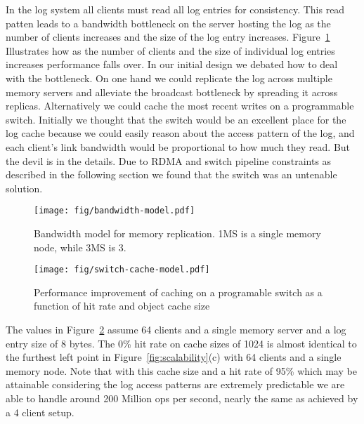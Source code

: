 \documentclass[12pt]{ucsddissertation}
\begin{document}
In the log system all clients must read all log entries for consistency. This read patten leads to a
bandwidth bottleneck on the server hosting the log as the number of clients increases and the size
of the log entry increases.  Figure~\ref{fig:bandwidth-model} Illustrates how as the number of
clients and the size of individual log entries increases performance falls over. In our initial
design we debated how to deal with the bottleneck. On one hand we could replicate the log across
multiple memory servers and alleviate the broadcast bottleneck by spreading it across replicas.
Alternatively we could cache the most recent writes on a programmable switch.  Initially we thought
that the switch would be an excellent place for the log cache because we could easily reason about
the access pattern of the log, and each client's link bandwidth would be proportional to how much
they read. But the devil is in the details. Due to RDMA and switch pipeline constraints as described
in the following section we found that the switch was an untenable solution.

\begin{figure}
\centering
\texttt{[image: fig/bandwidth-model.pdf]}
\caption{Bandwidth model for memory replication. 1MS is a single memory node, while 3MS is 3.}
\label{fig:bandwidth-model}
\end{figure}

\begin{figure}
    \centering
    \texttt{[image: fig/switch-cache-model.pdf]}
    \caption{Performance improvement of caching on a programable switch as a function of hit rate and object cache size}
    \label{fig:switch-cache-model}
\end{figure}

The values in Figure~\ref{fig:switch-cache-model} assume 64 clients and a single memory server and a
log entry size of 8 bytes. The 0\% hit rate on cache sizes of 1024 is almost identical to the
furthest left point in Figure~\ref{fig:scalability}(c) with 64 clients and a single memory node.
Note that with this cache size and a hit rate of 95\% which may be attainable considering the log
access patterns are extremely predictable we are able to handle around 200 Million ops per second,
nearly the same as achieved by a 4 client setup.
\end{document}
